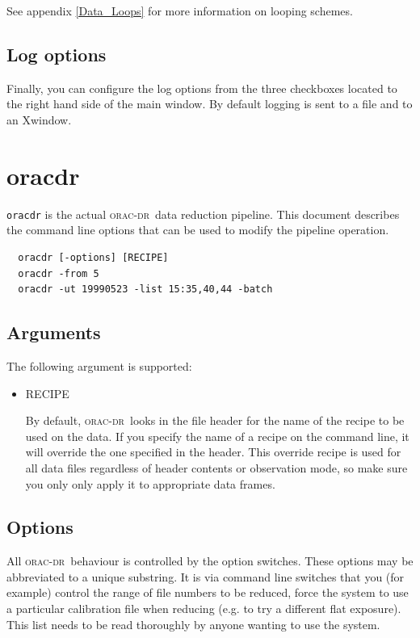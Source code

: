 \documentclass[twoside,11pt]{article}
\renewcommand{\_}{\texttt{\symbol{95}}}
\newcommand{\oracdr}{\textsc{orac-dr}}
\begin{document}
See appendix \ref{Data_Loops} for more information on looping
schemes.

\subsection*{Log options\label{Xoracdr_LOG_OPTIONS}}

Finally, you can configure the log options from the three checkboxes
located to the right hand side of the main window. By default logging
is sent to a file and to an Xwindow.

\section{oracdr\label{oracdr}}

\texttt{oracdr} is the actual \oracdr\ data reduction pipeline. 
This document describes the command line options that
can be used to modify the pipeline operation.

\begin{verbatim}
  oracdr [-options] [RECIPE]
  oracdr -from 5
  oracdr -ut 19990523 -list 15:35,40,44 -batch
\end{verbatim}

\subsection*{Arguments\label{oracdr_Arguments}}

The following argument  is  supported:

\begin{itemize}
\item RECIPE

By default, \oracdr\ looks in the file header for the name of the
recipe to be used on the data. If you specify the name of a recipe on
the command line, it will override the one specified in the
header. This override recipe is used for all data files regardless of
header contents or observation mode, so make sure you only only apply
it to appropriate data frames.

\end{itemize}
\subsection*{Options\label{oracdr_Options}}

All \oracdr\ behaviour is controlled by the option
switches. These options may be abbreviated to a unique substring. It
is via command line switches that you (for example) control the range
of file numbers to be reduced, force the system to use a particular
calibration file when reducing (e.g. to try a different flat
exposure). This list needs to be read thoroughly by anyone wanting to
use the system.
\end{document}
